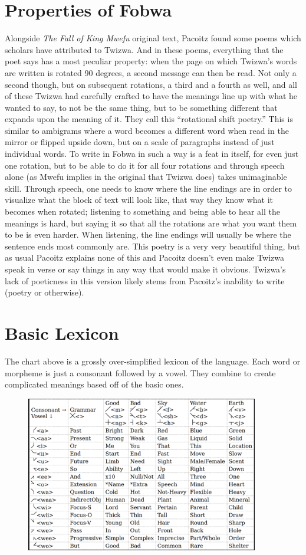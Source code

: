 \section{Properties of Fobwa}
\label{rotshift}
Alongside \emph{The Fall of King Mwe\-fu} original text, Pa\-co\-itz found some poems which scholars have attributed to Twi\-zwa. And in these poems, everything that the poet says has a most peculiar property: when the page on which Twi\-zwa's words are written is rotated 90 degrees, a second message can then be read. Not only a second though, but on subsequent rotations, a third and a fourth as well, and all of these Twi\-zwa had carefully crafted to have the meanings line up with what he wanted to say, to not be the same thing, but to be something different that expands upon the meaning of it. They call this ``rotational shift poetry.'' This is similar to ambigrams where a word becomes a different word when read in the mirror or flipped upside down, but on a scale of paragraphs instead of just individual words. To write in Fo\-bwa in such a way is a feat in itself, for even just one rotation, but to be able to do it for all four rotations and through speech alone (as Mwe\-fu implies in the original that Twi\-zwa does) takes unimaginable skill. Through speech, one needs to know where the line endings are in order to visualize what the block of text will look like, that way they know what it becomes when rotated; listening to something and being able to hear all the meanings is hard, but saying it so that all the rotations are what you want them to be is even harder. When listening, the line endings will usually be where the sentence ends most commonly are. This poetry is a very very beautiful thing, but as usual Pa\-co\-itz explains none of this and Pa\-co\-itz doesn't even make Twi\-zwa speak in verse or say things in any way that would make it obvious. Twi\-zwa's lack of poeticness in this version likely stems from Pa\-co\-itz's inability to write (poetry or otherwise).

\clearpage
\section{Basic Lexicon}
The chart above is a grossly over-simplified lexicon of the language. Each word or morpheme is just a consonant followed by a vowel. They combine to create complicated meanings based off of the basic ones.

\begin{figure}
\includegraphics[width=4.0in]{language.png}
\end{figure}
\clearpage

